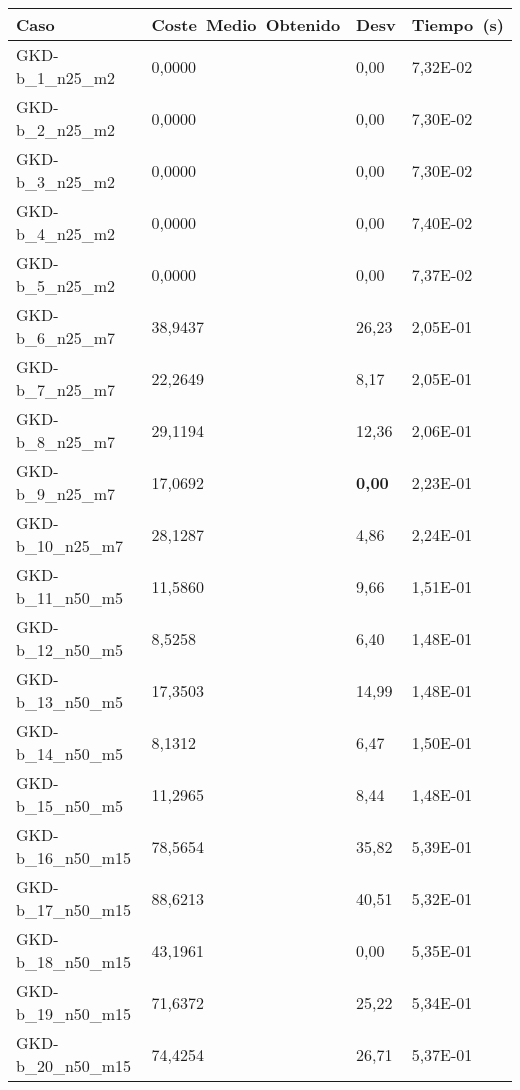 \pagebreak

\begin{table}[!ht]%
    \centering    
    \begin{adjustbox}{height=12cm}
    \begin{tabular}{|l|l|l|l|}
    \hline
        Caso & Coste~Medio~Obtenido & Desv & Tiempo~(s) \\ \hline
		GKD-b\_1\_n25\_m2    & 0,0000   & 0,00          & 7,32E-02 \\ \hline
		GKD-b\_2\_n25\_m2    & 0,0000   & 0,00          & 7,30E-02 \\ \hline
		GKD-b\_3\_n25\_m2    & 0,0000   & 0,00          & 7,30E-02 \\ \hline
		GKD-b\_4\_n25\_m2    & 0,0000   & 0,00          & 7,40E-02 \\ \hline
		GKD-b\_5\_n25\_m2    & 0,0000   & 0,00          & 7,37E-02 \\ \hline
		GKD-b\_6\_n25\_m7    & 38,9437  & 26,23         & 2,05E-01 \\ \hline
		GKD-b\_7\_n25\_m7    & 22,2649  & 8,17          & 2,05E-01 \\ \hline
		GKD-b\_8\_n25\_m7    & 29,1194  & 12,36         & 2,06E-01 \\ \hline
		GKD-b\_9\_n25\_m7    & 17,0692  & \textbf{0,00} & 2,23E-01 \\ \hline
		GKD-b\_10\_n25\_m7   & 28,1287  & 4,86          & 2,24E-01 \\ \hline
		GKD-b\_11\_n50\_m5   & 11,5860  & 9,66          & 1,51E-01 \\ \hline
		GKD-b\_12\_n50\_m5   & 8,5258   & 6,40          & 1,48E-01 \\ \hline
		GKD-b\_13\_n50\_m5   & 17,3503  & 14,99         & 1,48E-01 \\ \hline
		GKD-b\_14\_n50\_m5   & 8,1312   & 6,47          & 1,50E-01 \\ \hline
		GKD-b\_15\_n50\_m5   & 11,2965  & 8,44          & 1,48E-01 \\ \hline
		GKD-b\_16\_n50\_m15  & 78,5654  & 35,82         & 5,39E-01 \\ \hline
		GKD-b\_17\_n50\_m15  & 88,6213  & 40,51         & 5,32E-01 \\ \hline
		GKD-b\_18\_n50\_m15  & 43,1961  & 0,00          & 5,35E-01 \\ \hline
		GKD-b\_19\_n50\_m15  & 71,6372  & 25,22         & 5,34E-01 \\ \hline
		GKD-b\_20\_n50\_m15  & 74,4254  & 26,71         & 5,37E-01 \\ \hline

\end{tabular}
\end{adjustbox}
\end{table}
